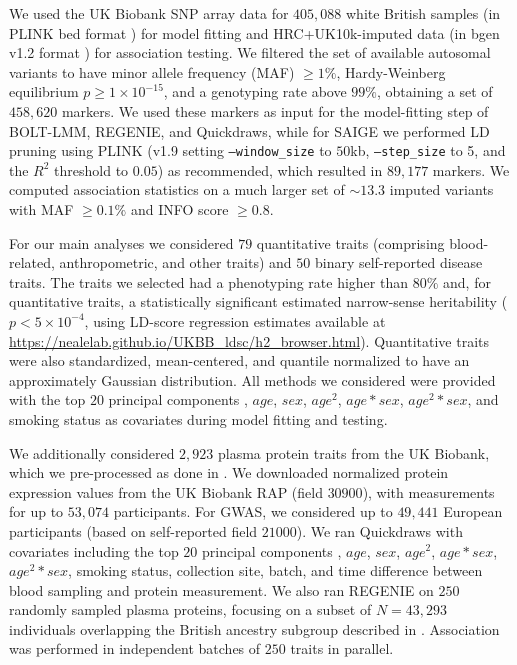 We used the UK Biobank SNP array data for $405{,}088$ white British samples \cite{bycroft2018uk} (in PLINK bed format \cite{purcell2007plink,chang2015second}) for model fitting and HRC+UK10k-imputed data \cite{haplotype2016reference,uk10k2015uk10k,bycroft2018uk} (in bgen v1.2 format \cite{band2018bgen}) for association testing.
%
We filtered the set of available autosomal variants to have minor allele frequency (MAF) $\geq 1\%$, Hardy-Weinberg equilibrium $p \geq 1 \times 10^{-15}$, and a genotyping rate above $99\%$, obtaining a set of $458{,}620$ markers.
%
We used these markers as input for the model-fitting step of BOLT-LMM, REGENIE, and Quickdraws, while for SAIGE we performed LD pruning using PLINK (v1.9 \cite{purcell2007plink,chang2015second} setting \texttt{--window\_size} to $50$kb, \texttt{--step\_size} to 5, and the $R^2$ threshold to $0.05$) as recommended, which resulted in $89,177$ markers.
%
We computed association statistics on a much larger set of ${\sim}13.3$ imputed variants with MAF $\geq 0.1\%$ and INFO score $\geq 0.8$.
%

%
For our main analyses we considered $79$ quantitative traits (comprising blood-related, anthropometric, and other traits) and $50$ binary self-reported disease traits.
%
The traits we selected had a phenotyping rate higher than $80\%$ and, for quantitative traits, a statistically significant estimated narrow-sense heritability ($p < 5 \times 10^{-4}$, using LD-score regression estimates available at \url{https://nealelab.github.io/UKBB_ldsc/h2_browser.html}).
%
Quantitative traits were also standardized, mean-centered, and quantile normalized to have an approximately Gaussian distribution.
%
All methods we considered were provided with the top $20$ principal components \cite{bycroft2018uk}, $age$, $sex$, $age^2$, $age*sex$, $age^2*sex$, and smoking status as covariates during model fitting and testing.
%

We additionally considered $2{,}923$ plasma protein traits from the UK Biobank, which we pre-processed as done in \cite{sun2023plasma, dhindsa2023rare}.
%
We downloaded normalized protein expression values from the UK Biobank RAP (field $30900$), with measurements for up to $53{,}074$ participants.
%
For GWAS, we considered up to $49{,}441$ European participants (based on self-reported field $21000$).
%
We ran Quickdraws with covariates including the top $20$ principal components \cite{bycroft2018uk}, $age$, $sex$, $age^2$, $age*sex$, $age^2*sex$, smoking status, collection site, batch, and time difference between blood sampling and protein measurement.
%
We also ran REGENIE on $250$ randomly sampled plasma proteins, focusing on a subset of $N=43{,}293$ individuals overlapping the British ancestry subgroup described in \cite{bycroft2018uk}.
%
Association was performed in independent batches of $250$ traits in parallel.

